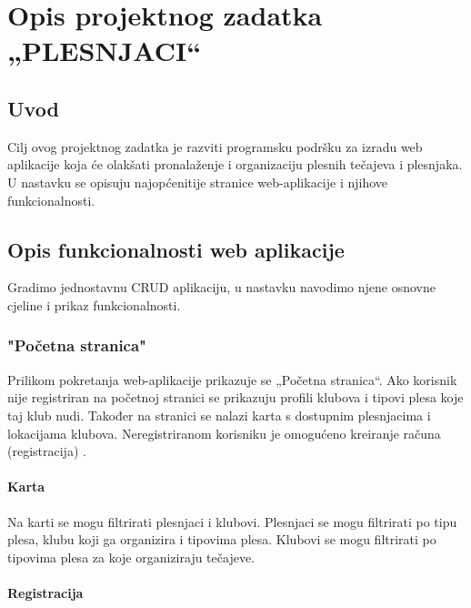 \chapter{Opis projektnog zadatka „PLESNJACI“ }
\section{Uvod}
		
		Cilj ovog projektnog zadatka je razviti programsku podršku za izradu web aplikacije koja će olakšati pronalaženje i organizaciju plesnih tečajeva i plesnjaka. U nastavku se opisuju najopćenitije stranice web-aplikacije i njihove funkcionalnosti. 
		
\section{Opis funkcionalnosti web aplikacije}
		 
		      Gradimo jednostavnu CRUD aplikaciju, u nastavku navodimo njene osnovne cjeline i prikaz funkcionalnosti.
		 
	 	\subsection{"Početna stranica"}
	
			Prilikom pokretanja web-aplikacije prikazuje se „Početna stranica“. Ako korisnik nije       registriran na početnoj stranici se prikazuju profili klubova i tipovi plesa koje taj klub nudi. Također na stranici se nalazi karta s dostupnim plesnjacima i lokacijama klubova. Neregistriranom korisniku je omogućeno kreiranje računa (registracija) . 
		

			 
			\subsubsection{Karta}
				
			Na karti se mogu filtrirati plesnjaci i klubovi. Plesnjaci se mogu filtrirati po tipu plesa, klubu koji ga organizira i tipovima plesa. Klubovi se mogu filtrirati po tipovima plesa za koje organiziraju tečajeve.
			\bigskip
			\bigskip
			\bigskip
			\bigskip
			\bigskip
			
			
				
			\subsubsection{Registracija}
				
